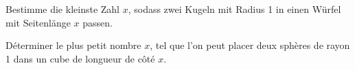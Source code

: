 Bestimme die kleinste Zahl $x$, sodass zwei Kugeln mit Radius 1 in einen Würfel mit Seitenlänge $x$ passen.

\bigskip

Déterminer le plus petit nombre $x$, tel que l'on peut placer deux sphères de rayon 1 dans un cube de longueur de côté $x$.